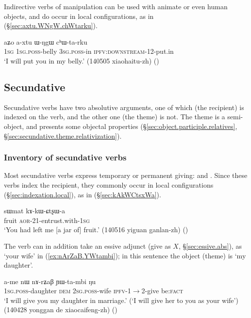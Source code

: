 Indirective verbs of manipulation can be used with animate or even human objects, and do occur in local configurations, as in (§\ref{sec:axtu.WNgW.chWtarku}).

\begin{exe}
	\ex \label{sec:axtu.WNgW.chWtarku}
	\gll  aʑo a-xtu ɯ-ŋgɯ cʰɯ-ta-rku \\
	\textsc{1sg} \textsc{1sg}.\textsc{poss}-belly \textsc{3sg}.\textsc{poss}-in \textsc{ipfv}:\textsc{downstream}-1\fl{}2-put.in \\
	\glt `I will put you in my belly.' (140505 xiaohaitu-zh) ()
\end{exe}

\subsection{Secundative} \label{sec:ditransitive.secundative}
Secundative verbs have two absolutive arguments, one of which (the recipient) is indexed on the verb, and the other one (the theme) is not. The theme is a semi-object, and presents some objectal properties (§\ref{sec:object.participle.relatives}, §\ref{sec:secundative.theme.relativization}).

\subsubsection{Inventory of secundative verbs}
Most secundative verbs express temporary or permanent giving:  and . Since these verbs index the recipient, they commonly occur in local configurations (§\ref{sec:indexation.local}), as in (§\ref{sec:kAkWCtsxWa}).

\begin{exe}
	\ex \label{sec:kAkWCtsxWa}
	\gll  sɯmat kɤ-kɯ-ɕtʂɯ-a \\
	fruit \textsc{aor}-2\fl{}1-entrust.with-\textsc{1sg} \\
	\glt `You had left me [a jar of] fruit.' (140516 yiguan ganlan-zh) ()
\end{exe}

The verb  can in addition take an essive adjunct (give as $X$, §\ref{sec:essive.abs}), as  `your wife' in (\ref{ex:nArZaB.YWtambi}); in this sentence the object (theme) is  `my daughter'.

\begin{exe}
	\ex \label{ex:nArZaB.YWtambi}
	\gll   a-me nɯ nɤ-rʑaβ ɲɯ-ta-mbi ŋu \\
	\textsc{1sg}.\textsc{poss}-daughter \textsc{dem} \textsc{2sg}.\textsc{poss}-wife \textsc{ipfv}-1$\rightarrow$2-give be:\textsc{fact} \\
	\glt `I will give you my daughter in marriage.' (`I will give her to you as your wife') (140428 yonggan de xiaocaifeng-zh)
()
\end{exe}

